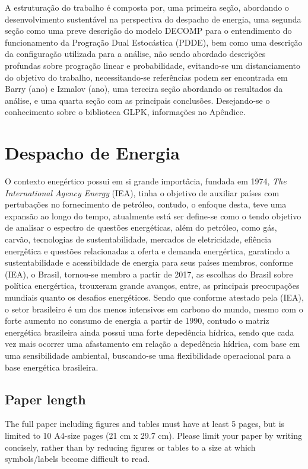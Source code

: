 \documentclass[12pt,fleqn]{article}
\begin{document}
A estrutura\c c\~ao do trabalho \'e composta por, uma primeira se\c c\~ao, abordando o desenvolvimento sustent\'avel na
perspectiva do despacho de energia, uma segunda se\c c\~ao como uma preve descri\c c\~ao do modelo DECOMP para o
entendimento do funcionamento da Progra\c c\~ao Dual Estoc\'astica (PDDE), bem como uma descri\c c\~ao da configura\c
c\~ao utilizada para a an\'alise, n\~ao sendo abordado descri\c c\~oes profundas sobre progra\c c\~ao linear e
probabilidade, evitando-se um distanciamento do objetivo do trabalho, necessitando-se refer\^encias podem ser encontrada
em Barry (ano) e Izmalov (ano), uma terceira se\c c\~ao abordando os resultados da an\'alise, e uma quarta se\c c\~ao com
as principais conclus\~oes. Desejando-se o conhecimento sobre o biblioteca GLPK, informa\c c\~oes no Ap\^endice.

\section{Despacho de Energia}
O contexto eneg\'ertico possui em si grande import\^acia, fundada em 1974, \textit{The International Agency Energy}
(IEA), tinha o objetivo de auxiliar pa\'ises com pertuba\c c\~oes no fornecimento de petr\'oleo, contudo, o enfoque
desta, teve uma expans\~ao ao longo do tempo, atualmente est\'a ser define-se como o tendo objetivo de analisar o
espectro de quest\~oes energ\'eticas, al\'em do petr\'oleo, como g\'as, carv\~ao, tecnologias de sustentabilidade,
mercados de eletricidade, efi\^encia energ\^etica e quest\~oes relacionadas a oferta e demanda energ\'ertica, garatindo
a sustentabilidade e acessibildade de energia para seus pa\'ises membros, conforme (IEA), o Brasil, tornou-se membro a
partir de 2017, as escolhas do Brasil sobre pol\'itica energ\'ertica, trouxeram grande avan\c cos, entre, as principais
preocupa\c c\~oes mundiais quanto os desafios energ\'eticos. Sendo que conforme atestado pela (IEA), o setor brasileiro
\'e um dos menos intensivos em carbono do mundo, mesmo com o forte aumento no consumo de energia a partir de 1990,
contudo o matriz energ\'etica brasileira ainda possui uma forte deped\^encia h\'idrica, sendo que cada vez mais ocorrer
uma afastamento em rela\c c\~ao a deped\^encia h\'idrica, com base em uma sensibilidade ambiental, buscando-se uma
flexibilidade operacional para a base energ\'etica brasileira.  

\newpage %
\subsection{Paper length}
The full paper including figures and tables must have at least 5 pages, but is limited to 10 A4-size pages (21 cm x 29.7 cm). Please limit your paper by writing concisely, rather than by reducing figures or tables to a size at which symbols/labels become difficult to read.
\end{document}
